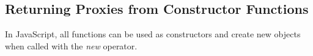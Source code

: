










\subsection{Returning Proxies from Constructor Functions} 

In JavaScript, all functions can be used as constructors and create new objects when called with the \emph{new} operator.




